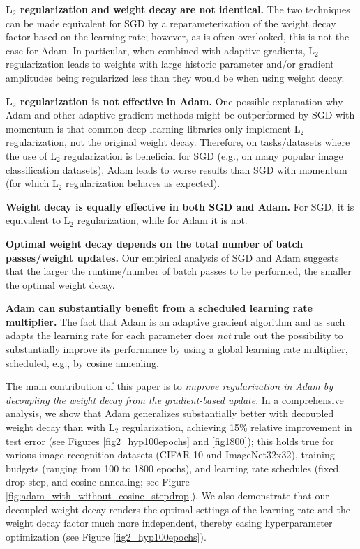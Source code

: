 \documentclass[usenames,dvipsnames]{article}
\begin{document}
\begin{description}
	\item \textbf{L$_2$ regularization and weight decay are not identical.} The two techniques can be made equivalent for SGD by a reparameterization of the weight decay factor based on the learning rate; however, as is often overlooked, this is not the case for Adam. 
In particular, when combined with adaptive gradients, L$_2$ regularization leads to weights with large historic parameter and/or gradient amplitudes being regularized less than they would be when using weight decay.

	\item \textbf{L$_2$ regularization is not effective in Adam.} One possible explanation why Adam and other adaptive gradient methods might be outperformed by SGD with momentum is that common deep learning libraries only implement L$_2$ regularization, not the original weight decay. Therefore, on tasks/datasets where the use of L$_2$ regularization is beneficial for SGD (e.g., on many popular image classification datasets), Adam leads to worse results than SGD with momentum (for which L$_2$ regularization behaves as expected). 
    
	\item \textbf{Weight decay
    is equally effective in both SGD and Adam.} For SGD, it is equivalent to L$_2$ regularization, while for Adam it is not.
    
	\item \textbf{Optimal weight decay depends on the total number of batch passes/weight updates.} Our empirical analysis of SGD and Adam suggests that the larger the runtime/number of batch passes to be performed, the smaller the optimal weight decay. 

	\item \textbf{Adam can substantially benefit from a scheduled learning rate multiplier.}
    The fact that Adam is an adaptive gradient algorithm and as such adapts the learning rate for each parameter does \emph{not} rule out the possibility to substantially improve its performance by using a global learning rate multiplier, scheduled, e.g., by cosine annealing.
\end{description}
 
The main contribution of this paper is to \emph{improve regularization in Adam by decoupling the weight decay from the gradient-based update}. In a comprehensive analysis, we show that Adam generalizes substantially better with decoupled weight decay than with L$_2$ regularization, achieving 15\% relative improvement in test error (see Figures \ref{fig2_hyp100epochs} and \ref{fig1800}); this holds true for various image recognition datasets (CIFAR-10 and ImageNet32x32), training budgets (ranging from 100 to 1800 epochs), and learning rate schedules (fixed, drop-step, and cosine annealing; see Figure \ref{fig:adam_with_without_cosine_stepdrop}).
We also demonstrate that our decoupled weight decay renders the optimal settings of the learning rate and the weight decay factor much more independent, thereby easing hyperparameter optimization (see Figure \ref{fig2_hyp100epochs}). 
\end{document}
